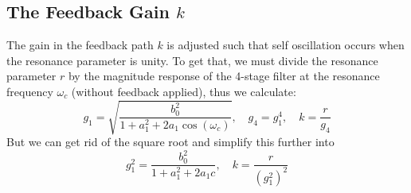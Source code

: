 \subsection{The Feedback Gain $k$}
The gain in the feedback path $k$ is adjusted such that self oscillation occurs when the resonance parameter is unity. To get that, we must divide the resonance parameter $r$ by the magnitude response of the 4-stage filter at the resonance frequency $\omega_c$ (without feedback applied), thus we calculate:
\begin{equation}
 g_1 = \sqrt{\frac{b_0^2}{1 + a_1^2 + 2 a_1 \cos (\omega_c)}}, \quad g_4 = g_1^4, \quad k = \frac{r}{g_4}
\end{equation}
But we can get rid of the square root and simplify this further into
\begin{equation}
\boxed
{
 g_1^2 = \frac{b_0^2}{1 + a_1^2 + 2 a_1 c}, \quad k = \frac{r}{(g_1^2)^2}
}
\end{equation}

